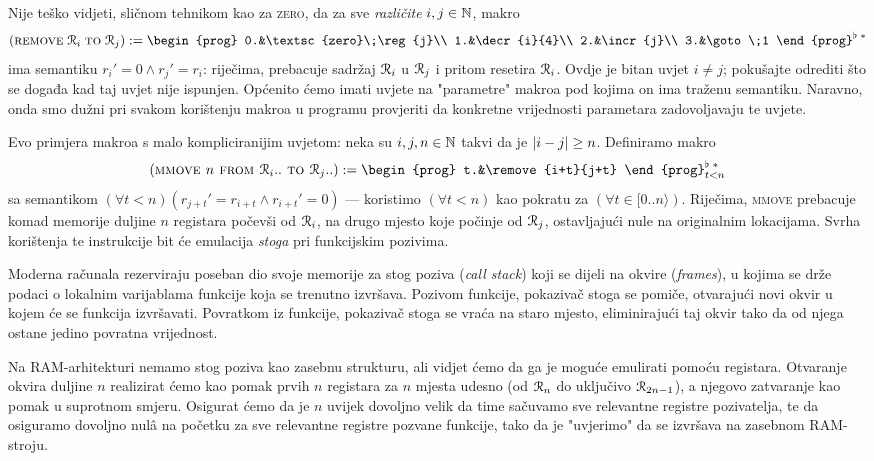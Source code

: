 Nije teško vidjeti, sličnom tehnikom kao za \textsc{zero}, da za sve \emph{različite} $i,j\in{\mathbb N}$, makro
\begin{equation}
    (\remove{i}{j}):=\begin{prog}
    0.&\textsc{zero}\;\reg{j}\\
    1.&\decr{i}{4}\\
    2.&\incr{j}\\
    3.&\goto\;1
    \end{prog}^{\flat\;*}
\end{equation}
ima semantiku $r_i'=0\land r_j'=r_i$: riječima, prebacuje sadržaj $\mathcal R_{i}$ u $\mathcal R_{j}$ i pritom resetira $\mathcal R_{i}$. Ovdje je bitan uvjet $i\not=j$; pokušajte odrediti što se događa kad taj uvjet nije ispunjen. Općenito ćemo imati uvjete na "parametre" makroa pod kojima on ima traženu semantiku. Naravno, onda smo dužni pri svakom korištenju makroa u programu provjeriti da konkretne vrijednosti parametara zadovoljavaju te uvjete.

Evo primjera makroa s malo kompliciranijim uvjetom: neka su $i,j,n\in{\mathbb N}$ takvi da je $\lvert i-j\rvert\ge n$. Definiramo makro
\begin{equation}
    (\textsc{mmove $n$ from $\reg{i}..$ to $\reg{j}..$}):=\begin{prog}
    t.&\remove{i+t}{j+t}
    \end{prog}_{t<n}^{\flat\;*}
\end{equation}
sa semantikom $(\forall t<n)(r_{j+t}'=r_{i+t}\land r_{i+t}'=0)$ --- koristimo $(\forall t<n)$ kao pokratu za $(\forall t\in[0..n\rangle)$. Riječima, \textsc{mmove} prebacuje komad memorije duljine $n$ registara počevši od $\mathcal R_{i}$, na drugo mjesto koje počinje od $\mathcal R_{j}$, ostavljajući nule na originalnim lokacijama. Svrha korištenja te instrukcije bit će emulacija \emph{stoga} pri funkcijskim pozivima.

Moderna računala rezerviraju poseban dio svoje memorije za stog poziva (\emph{call stack}) koji se dijeli na okvire (\emph{frames}), u kojima se drže podaci o lokalnim varijablama funkcije koja se trenutno izvršava. Pozivom funkcije, pokazivač stoga se pomiče, otvarajući novi okvir u kojem će se funkcija izvršavati. Povratkom iz funkcije, pokazivač stoga se vraća na staro mjesto, eliminirajući taj okvir tako da od njega ostane jedino povratna vrijednost.

Na RAM-arhitekturi nemamo stog poziva kao zasebnu strukturu, ali vidjet ćemo da ga je moguće emulirati pomoću registara. Otvaranje okvira duljine $n$ realizirat ćemo kao pomak prvih $n$ registara za $n$ mjesta udesno (od $\mathcal R_{n}$ do uključivo $\mathcal R_{2n-1}$), a njegovo zatvaranje kao pomak u suprotnom smjeru. Osigurat ćemo da je $n$ uvijek dovoljno velik da time sačuvamo sve relevantne registre pozivatelja, te da osiguramo dovoljno nulâ na početku za sve relevantne registre pozvane funkcije, tako da je "uvjerimo" da se izvršava na zasebnom RAM-stroju.

